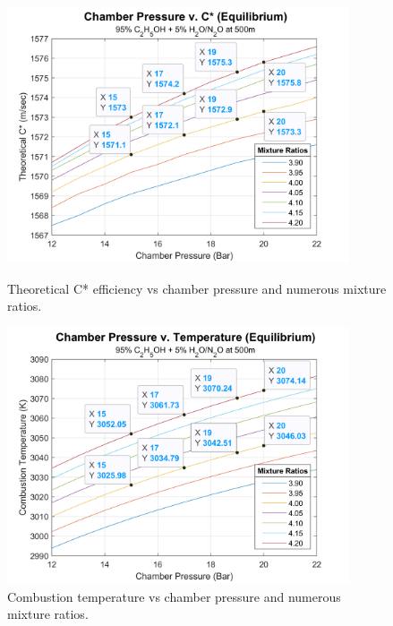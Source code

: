 \documentclass[9pt]{article} %
\numberwithin{equation}{section} %
\begin{document}
\begin{figure}
    \centering
    \begin{minipage}{0.475\textwidth}
        \centering
        \includegraphics[scale=0.5, width=0.9\textwidth]{cp_cstar_mix_labeled} %
        \caption{Theoretical C* efficiency vs chamber pressure and numerous mixture ratios.}
        \label{fig:cp_cstar}
    \end{minipage}\hfill
    \begin{minipage}{0.475\textwidth}
        \centering
        \includegraphics[scale=0.5, width=0.9\textwidth]{cp_temp_mix_labeled} %
        \caption{Combustion temperature vs chamber pressure and numerous mixture ratios.}
        \label{fig:cp_temp}
    \end{minipage}
\end{figure} 
\end{document}
